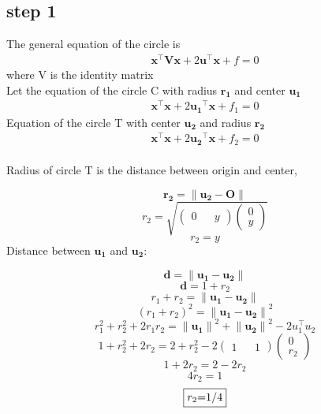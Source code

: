 \documentclass[10pt, a4paper]{article}
\newcommand{\myvec}[1]{\ensuremath{\begin{pmatrix}#1\end{pmatrix}}}
\let\vec\mathbf
\begin{document}
\subsection*{\large step 1}
The general equation of the circle is
\begin{align}
\vec{x}^{\top}\vec{V}\vec{x}+2\vec{u}^{\top}\vec{x}+f=0
\end{align}
where V is the identity matrix
\\Let the equation of the circle C with radius $\vec{r_1}$ and center $\vec{u_1}$
\begin{align}
\vec{x}^{\top}\vec{x}+2\vec{u_1}^{\top}\vec{x}+f_1=0
\end{align}
Equation of the circle T with center $\vec{u_2}$ and radius $\vec{r_2}$
\begin{align}
\vec{x}^{\top}\vec{x}+2\vec{u_2}^{\top}\vec{x}+f_2=0
\end{align}\\
Radius of circle T is the distance between origin and center,\\
\raggedright \large 
\begin{equation}
\vec{r_2}={\vec{\|u_2-O\|}}
\end{equation}
\begin{equation}
r_2=\sqrt{{\myvec{0 && y} }{\myvec{0 \\ y}}}
\end{equation}
\begin{equation}
\boxed{r_2=y}
\end{equation}
Distance between $\vec{u_1}$ and $\vec{u_2}$:
\raggedright \large 
\begin{equation}
\vec{d}={\vec{\|u_1-u_2\|}}
\end{equation}
\begin{equation}
\vec{d}=1+r_2
\end{equation}
\begin{equation}
r_1+r_2=\vec{\|u_1 -u_2\|} 
\end{equation}
\begin{equation}
(r_1+r_2)^2=\vec{\|u_1 -u_2\|}^2 
\end{equation}
\begin{equation}
r_1^2 + r_2^2 +2 r_1 r_2=\vec{\|u_1 \|}^2 + \vec{\|u_2\|}^2 -2  u_1 ^{\top} u_2 
\end{equation}
\begin{equation}
1+r_2^2 +2 r_2= 2+r_2^2 -2{\myvec{1 && 1} }{\myvec{0 \\ r_2} }
\end{equation}
\begin{equation}
1+2 r_2=2-2 r_2
\end{equation}
\begin{equation}
4 r_2=1
\end{equation}
\begin{equation}
\boxed{$$r_2$=1/4$}
\end{equation}
\vspace{2mm} 
\vspace{5mm}
 \vspace{2mm} 
\end{document}
